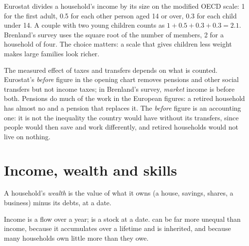 \begin{measure}
Eurostat divides a household's income by its size on the modified OECD scale: 1 for the first adult, 0.5 for each other person aged 14 or over, 0.3 for each child under 14.
A couple with two young children counts as $1 + 0.5 + 0.3 + 0.3 = 2.1$. Brenland's survey uses the square root of the number of members, 2 for a household of four. The
choice matters: a scale that gives children less weight makes large families look richer.
\end{measure}

The measured effect of taxes and transfers depends on what is counted. Eurostat's \emph{before} figure in the opening chart removes pensions and other social transfers
but not income taxes; in Brenland's survey, \emph{market} income is before both. Pensions do much of the work in the European figures: a retired household has almost no
 and a pension that replaces it. The \emph{before} figure is an accounting one: it is not the inequality the country
would have without its transfers, since people would then save and work differently, and retired households would not live on nothing.

\section{Income, wealth and skills}\label{sec:g11:inequality:wealth}

\begin{definition}[Wealth]\label{def:g11:inequality:wealth}
A household's \emph{wealth} is the value of what it owns (a house, savings, shares, a business) minus its debts, at a date.
\end{definition}

Income is a flow over a year;  is a stock at a date.  can be far more unequal than income, because it accumulates over a lifetime and is inherited, and
because many households own little more than they owe.

